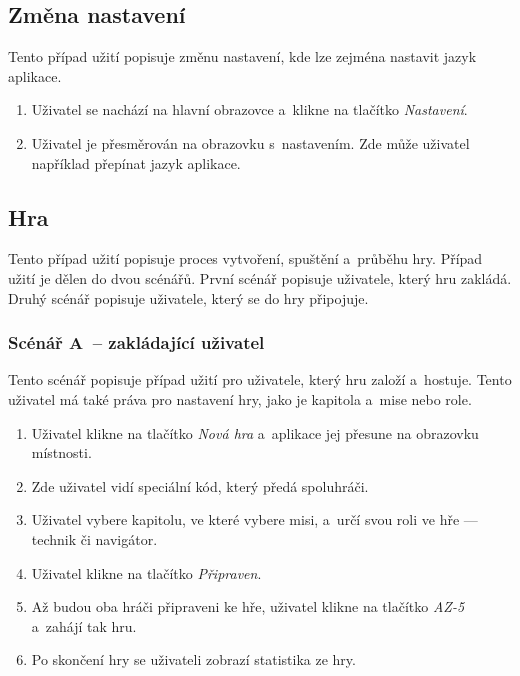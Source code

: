 \subsection{Změna nastavení}

Tento případ užití popisuje změnu nastavení,
kde lze zejména nastavit jazyk aplikace.

\begin{enumerate}
    \item Uživatel se nachází na hlavní obrazovce a~klikne na tlačítko
    \emph{Nastavení}.
    \item Uživatel je přesměrován na obrazovku s~nastavením.
    Zde může uživatel například přepínat jazyk aplikace.
\end{enumerate}

\subsection{Hra}

Tento případ užití popisuje proces vytvoření, spuštění a~průběhu hry.
Případ užití je dělen do dvou scénářů.
První scénář popisuje uživatele,
který hru zakládá.
Druhý scénář popisuje uživatele,
který se do hry připojuje.

\subsubsection*{Scénář A~-- zakládající uživatel}

Tento scénář popisuje případ užití pro uživatele,
který hru založí a~hostuje.
Tento uživatel má také práva pro nastavení hry,
jako je kapitola a~mise nebo role.

\begin{enumerate}
    \item Uživatel klikne na tlačítko \emph{Nová hra}
    a~aplikace jej přesune na obrazovku místnosti.
    \item Zde uživatel vidí speciální kód,
    který předá spoluhráči.
    \item Uživatel vybere kapitolu,
    ve které vybere misi,
    a~určí svou roli ve hře
    --- technik či navigátor.
    \item Uživatel klikne na tlačítko \emph{Připraven}.
    \item Až budou oba hráči připraveni ke hře,
    uživatel klikne na tlačítko \emph{AZ-5} a~zahájí tak hru.
    \item Po skončení hry se uživateli zobrazí statistika ze hry.
\end{enumerate}

